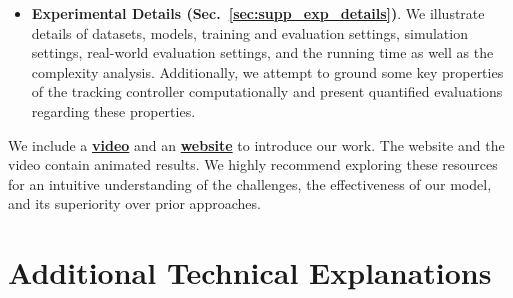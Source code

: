 \begin{itemize}
    \item  \textbf{Experimental Details (Sec.~\ref{sec:supp_exp_details})}. We illustrate details of datasets, models, training and evaluation settings, simulation settings, real-world evaluation settings, and the running time as well as the complexity analysis. \textcolor{myblue}{Additionally, we attempt to ground some key properties of the tracking controller computationally and present quantified evaluations regarding these properties. }
\end{itemize}


We include a \href{https://projectwebsite7.github.io/gene-dex-manip/static/videos-lowres/video_7.mp4}{\textbf{video}} and an \href{https://projectwebsite7.github.io/gene-dex-manip/}{\textbf{website}} to introduce our work. The website and the video contain animated results. We highly recommend exploring these resources for an intuitive understanding of the challenges, the effectiveness of our model, and its superiority over prior approaches.




\section{Additional Technical Explanations} \label{sec:supp_method}


